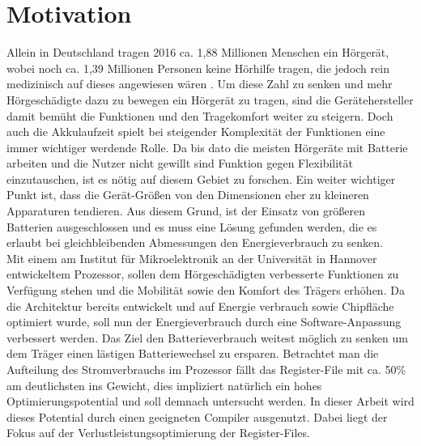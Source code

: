 \section{Motivation}
\label{sec:motivation}
Allein in Deutschland tragen 2016 ca. 1,88 Millionen Menschen ein Hörgerät, wobei noch ca. 1,39 Millionen Personen keine Hörhilfe tragen, die jedoch rein medizinisch auf dieses angewiesen wären \cite{statistica}. Um diese Zahl zu senken und mehr Hörgeschädigte dazu zu bewegen ein Hörgerät zu tragen, sind die Gerätehersteller damit bemüht die Funktionen und den Tragekomfort weiter zu steigern. Doch auch die Akkulaufzeit spielt bei steigender Komplexität der Funktionen eine immer wichtiger werdende Rolle. Da bis dato die meisten Hörgeräte mit Batterie arbeiten und die Nutzer nicht gewillt sind Funktion gegen Flexibilität einzutauschen, ist es nötig auf diesem Gebiet zu forschen. Ein weiter wichtiger Punkt ist, dass die Gerät-Größen von den Dimensionen eher zu kleineren Apparaturen tendieren. Aus diesem Grund, ist der Einsatz von größeren Batterien ausgeschlossen und es muss eine Lösung gefunden werden, die es erlaubt bei gleichbleibenden Abmessungen den Energieverbrauch zu senken.\\
Mit einem am Institut für Mikroelektronik an der Universität in Hannover entwickeltem Prozessor, sollen dem Hörgeschädigten verbesserte Funktionen zu Verfügung stehen und die Mobilität sowie den Komfort des Trägers erhöhen. Da die Architektur bereits entwickelt und auf Energie verbrauch sowie Chipfläche optimiert wurde, soll nun der Energieverbrauch durch eine Software-Anpassung verbessert werden.
Das Ziel den Batterieverbrauch weitest möglich zu senken um dem Träger einen lästigen Batteriewechsel zu ersparen.
Betrachtet man die Aufteilung des Stromverbrauchs im Prozessor fällt das Register-File mit ca. 50\% am deutlichsten ins Gewicht, dies impliziert natürlich ein hohes Optimierungspotential und soll demnach untersucht werden. In dieser Arbeit wird dieses Potential durch einen geeigneten Compiler ausgenutzt. Dabei liegt der Fokus auf der Verlustleistungsoptimierung der Register-Files.


